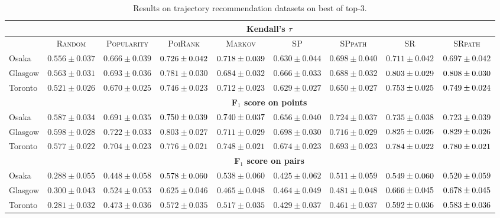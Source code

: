 \begin{table*}[!h]
\centering
\small
\setlength{\tabcolsep}{3pt} %
\begin{tabular}{l|cc|ccc|ccc} \hline
& \multicolumn{8}{c}{\bf Kendall's $\tau$} \\ \hline
 & \textsc{Random} & \textsc{Popularity} & \textsc{PoiRank} & \textsc{Markov} & \textsc{SP} & \textsc{SPpath} & \textsc{SR} & \textsc{SRpath} \\ \hline
Osaka & $0.556\pm0.037$ & $0.666\pm0.039$ & $\firstBest{0.726\pm0.042}$ & $\secondBest{0.718\pm0.039}$ & $0.630\pm0.044$ & $0.698\pm0.040$ & $0.711\pm0.042$ & $0.697\pm0.042$ \\
Glasgow & $0.563\pm0.031$ & $0.693\pm0.036$ & $0.781\pm0.030$ & $0.684\pm0.032$ & $0.666\pm0.033$ & $0.688\pm0.032$ & $\secondBest{0.803\pm0.029}$ & $\firstBest{0.808\pm0.030}$ \\
Toronto & $0.521\pm0.026$ & $0.670\pm0.025$ & $0.746\pm0.023$ & $0.712\pm0.023$ & $0.629\pm0.027$ & $0.650\pm0.027$ & $\firstBest{0.753\pm0.025}$ & $\secondBest{0.749\pm0.024}$ \\
\hline
& \multicolumn{8}{c}{\bf F$_1$ score on points} \\ \hline
Osaka & $0.587\pm0.034$ & $0.691\pm0.035$ & $\firstBest{0.750\pm0.039}$ & $\secondBest{0.740\pm0.037}$ & $0.656\pm0.040$ & $0.724\pm0.037$ & $0.735\pm0.038$ & $0.723\pm0.039$ \\
Glasgow & $0.598\pm0.028$ & $0.722\pm0.033$ & $0.803\pm0.027$ & $0.711\pm0.029$ & $0.698\pm0.030$ & $0.716\pm0.029$ & $\secondBest{0.825\pm0.026}$ & $\firstBest{0.829\pm0.026}$ \\
Toronto & $0.577\pm0.022$ & $0.704\pm0.023$ & $0.776\pm0.021$ & $0.748\pm0.021$ & $0.674\pm0.023$ & $0.693\pm0.023$ & $\firstBest{0.784\pm0.022}$ & $\secondBest{0.780\pm0.021}$ \\
\hline
& \multicolumn{8}{c}{\bf F$_1$ score on pairs} \\ \hline
Osaka & $0.288\pm0.055$ & $0.448\pm0.058$ & $\firstBest{0.578\pm0.060}$ & $0.538\pm0.060$ & $0.425\pm0.062$ & $0.511\pm0.059$ & $\secondBest{0.549\pm0.060}$ & $0.520\pm0.059$ \\
Glasgow & $0.300\pm0.043$ & $0.524\pm0.053$ & $0.625\pm0.046$ & $0.465\pm0.048$ & $0.464\pm0.049$ & $0.481\pm0.048$ & $\secondBest{0.666\pm0.045}$ & $\firstBest{0.678\pm0.045}$ \\
Toronto & $0.281\pm0.032$ & $0.473\pm0.036$ & $0.572\pm0.035$ & $0.517\pm0.035$ & $0.429\pm0.037$ & $0.461\pm0.037$ & $\firstBest{0.592\pm0.036}$ & $\secondBest{0.583\pm0.036}$ \\
\hline
\end{tabular}
\caption{Results on trajectory recommendation datasets on best of top-3.}
\end{table*}


